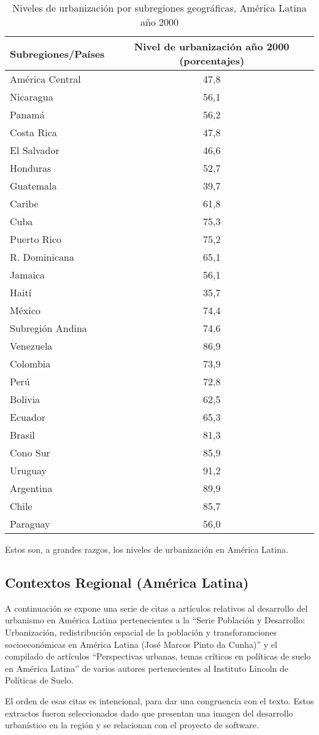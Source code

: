 \begin{table}
  \centering
  \caption{Niveles de urbanización por subregiones geográficas, América Latina año 2000}
  \label{regioneslatam}
  \begin{tabular}{|lc|}
    \hline
    Subregiones/Países & Nivel de urbanización año 2000 (porcentajes)\\
    \hline
    América Central &47,8\\
    \hline
    Nicaragua &56,1\\
    Panamá &56,2\\
    Costa Rica &47,8\\
    El Salvador &46,6\\
    Honduras &52,7\\
    Guatemala &39,7\\
    \hline
    Caribe &61,8\\
    \hline
    Cuba &75,3\\
    Puerto Rico &75,2\\
    R. Dominicana &65,1\\
    Jamaica &56,1\\
    Haití &35,7\\
    \hline
    México &74,4\\
    \hline
    Subregión Andina &74,6\\
    \hline
    Venezuela &86,9\\
    Colombia &73,9\\
    Perú &72,8\\
    Bolivia &62,5\\
    Ecuador &65,3\\
    \hline
    Brasil &81,3\\
    \hline
    Cono Sur &85,9\\
    \hline
    Uruguay &91,2\\
    Argentina &89,9\\
    Chile &85,7\\
    Paraguay &56,0\\
    \hline
  \end{tabular}
\end{table}

Estos son, a grandes razgos, los niveles de urbanización en América Latina.

\subsection{Contextos Regional (América Latina)}

A continuación se expone una serie de citas a artículos relativos al desarrollo del urbanismo en
América Latina pertenecientes a la ``Serie Población y Desarrollo: Urbanización, redistribución
espacial de la población y transforamciones socioeconómicas en América Latina (José Marcos Pinto da
Cunha)'' y el compilado de artículos ``Perspectivas urbanas, temas críticos en políticas de suelo en
América Latina'' de varios autores  pertenecientes al Instituto Lincoln de Políticas de Suelo.

El orden de esas citas es intencional, para dar una congruencia con el texto. Estos extractos fueron
seleccionados dado que presentan una imagen del desarrollo urbanístico en la región y se relacionan
con el proyecto de software.


